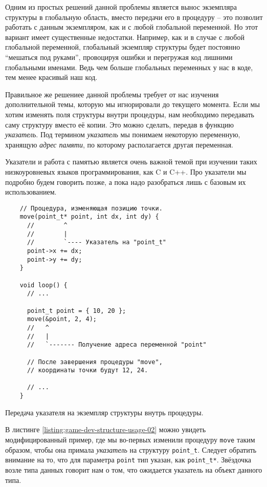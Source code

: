 \documentclass[../sparc.tex]{subfiles}
\begin{document}
Одним из простых решений данной проблемы является вынос экземпляра структуры в
глобальную область, вместо передачи его в процедуру -- это позволит работать с
данным экземпляром, как и с любой глобальной переменной.  Но этот вариант имеет
существенные недостатки.  Например, как и в случае с любой глобальной
переменной, глобальный экземпляр структуры будет постоянно ``мешаться под
руками'', провоцируя ошибки и перегружая код лишними глобальными именами.  Ведь
чем больше глобальных переменных у нас в коде, тем менее красивый наш код.

Правильное же решениее данной проблемы требует от нас изучения дополнительной
темы, которую мы игнорировали до текущего момента.  Если мы хотим изменять поля
структуры внутри процедуры, нам необходимо передавать саму структуру вместо её
копии. Это можно сделать, передав в функцию \emph{указатель}.  Под термином
\emph{указатель} мы понимаем некоторую переменную, хранящую \emph{адрес памяти},
по которому располагается другая переменная.

Указатели и работа с памятью является очень важной темой при изучении таких
низкоуровневых языков программирования, как C и C++.  Про указатели мы подробно
будем говорить позже, а пока надо разобраться лишь с базовым их использованием.

\begin{listing}[H]
  \begin{verbatim}
    // Процедура, изменяющая позицию точки.
    move(point_t* point, int dx, int dy) {
      //        ^
      //        |
      //        `---- Указатель на "point_t"
      point->x += dx;
      point->y += dy;
    }

    void loop() {
      // ...

      point_t point = { 10, 20 };
      move(&point, 2, 4);
      //   ^
      //   |
      //   `------- Получение адреса переменной "point"

      // После завершения процедуры "move",
      // координаты точки будут 12, 24.

      // ...
    }
  \end{verbatim}
  \caption{Передача указателя на экземпляр структуры внутрь процедуры.}
  \label{listing:game-dev-structure-usage-02}
\end{listing}

В листинге \ref{listing:game-dev-structure-usage-02} можно увидеть
модифицированный пример, где мы во-первых изменили процедуру \texttt{move} таким
образом, чтобы она примала \emph{указатель} на структуру \texttt{point\_t}.
Следует обратить внимание на то, что для параметра \texttt{point} тип указан,
как \texttt{point\_t*}.  Звёздочка возле типа данных говорит нам о том, что
ожидается указатель на объект данного типа.
\end{document}

